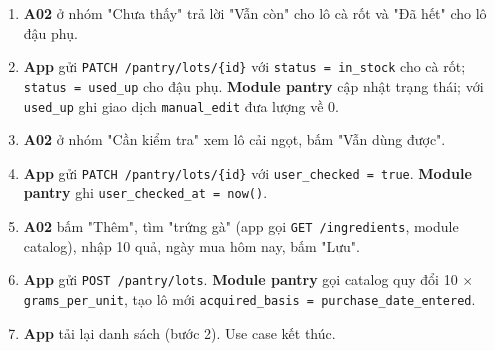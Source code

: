 \begin{enumerate}
\item \textbf{A02} ở nhóm "Chưa thấy" trả lời "Vẫn còn" cho lô cà rốt và "Đã hết" cho lô đậu phụ.
\item \textbf{App} gửi {\small\texttt{PATCH /\allowbreak{}\allowbreak{}pantry/\allowbreak{}\allowbreak{}lots/\allowbreak{}\allowbreak{}\{id\}}} với {\small\texttt{status = in\_\allowbreak{}\allowbreak{}stock}} cho cà rốt; {\small\texttt{status = used\_\allowbreak{}\allowbreak{}up}} cho đậu phụ. \textbf{Module pantry} cập nhật trạng thái; với {\small\texttt{used\_\allowbreak{}\allowbreak{}up}} ghi giao dịch {\small\texttt{manual\_\allowbreak{}\allowbreak{}edit}} đưa lượng về 0.
\item \textbf{A02} ở nhóm "Cần kiểm tra" xem lô cải ngọt, bấm "Vẫn dùng được".
\item \textbf{App} gửi {\small\texttt{PATCH /\allowbreak{}\allowbreak{}pantry/\allowbreak{}\allowbreak{}lots/\allowbreak{}\allowbreak{}\{id\}}} với {\small\texttt{user\_\allowbreak{}\allowbreak{}checked = true}}. \textbf{Module pantry} ghi {\small\texttt{user\_\allowbreak{}\allowbreak{}checked\_\allowbreak{}\allowbreak{}at = now()}}.
\item \textbf{A02} bấm "Thêm", tìm "trứng gà" (app gọi {\small\texttt{GET /\allowbreak{}\allowbreak{}ingredients}}, module catalog), nhập 10 quả, ngày mua hôm nay, bấm "Lưu".
\item \textbf{App} gửi {\small\texttt{POST /\allowbreak{}\allowbreak{}pantry/\allowbreak{}\allowbreak{}lots}}. \textbf{Module pantry} gọi catalog quy đổi 10 \ensuremath{\times} {\small\texttt{grams\_\allowbreak{}\allowbreak{}per\_\allowbreak{}\allowbreak{}unit}}, tạo lô mới {\small\texttt{acquired\_\allowbreak{}\allowbreak{}basis = purchase\_\allowbreak{}\allowbreak{}date\_\allowbreak{}\allowbreak{}entered}}.
\item \textbf{App} tải lại danh sách (bước 2). Use case kết thúc.
\end{enumerate}
